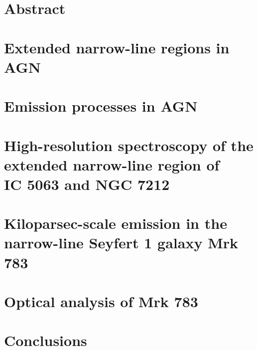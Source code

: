 \begin{frontespizio}
\Rientro{1.5cm}
\Punteggiatura{}
\end{frontespizio}


\frontmatter

\tableofcontents
\listoftables
\listoffigures

\mainmatter 
\chapter*{Abstract}



\chapter{Extended narrow-line regions in AGN}
\label{cap:intro}



\chapter{Emission processes in AGN}
\label{cap:emission}



\chapter[High-res. spectroscopy of ENLRs]{High-resolution spectroscopy of the extended narrow-line region of \\IC 5063 and NGC 7212}
\label{cap:paper1}



\chapter[KSE in the NLS1 Mrk 783]{Kiloparsec-scale emission in the narrow-line Seyfert 1 galaxy Mrk 783}
\label{cap:paper2}



\chapter{Optical analysis of Mrk 783}
\label{cap:paper3}



\chapter{Conclusions}
\label{cap:conclusions}












